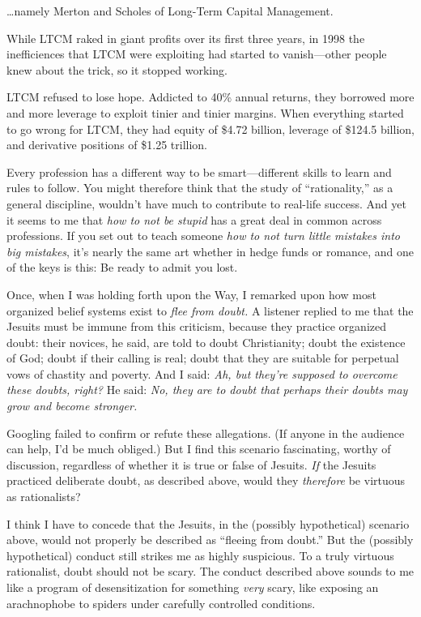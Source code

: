 {
 \ldots namely Merton and Scholes of Long-Term Capital Management.}

{
 While LTCM raked in giant profits over its first three years, in
1998 the inefficiences that LTCM were exploiting had started to
vanish---other people knew about the trick, so it stopped working.}

{
 LTCM refused to lose hope. Addicted to 40\% annual returns, they
borrowed more and more leverage to exploit tinier and tinier margins.
When everything started to go wrong for LTCM, they had equity of \$4.72
billion, leverage of \$124.5 billion, and derivative positions of
\$1.25 trillion.}

{
 Every profession has a different way to be smart---different
skills to learn and rules to follow. You might therefore think that the
study of ``rationality,'' as a
general discipline, wouldn't have much to contribute to
real-life success. And yet it seems to me that \textit{how to not be
stupid} has a great deal in common across professions. If you set out
to teach someone \textit{how to not turn little mistakes into big
mistakes}, it's nearly the same art whether in hedge
funds or romance, and one of the keys is this: Be ready to admit you
lost.}

\myendsectiontext


{
 Once, when I was holding forth upon the Way, I remarked upon how
most organized belief systems exist to \textit{flee from doubt.} A
listener replied to me that the Jesuits must be immune from this
criticism, because they practice organized doubt: their novices, he
said, are told to doubt Christianity; doubt the existence of God; doubt
if their calling is real; doubt that they are suitable for perpetual
vows of chastity and poverty. And I said: \textit{Ah, but
they're supposed to overcome these doubts, right?} He
said: \textit{No, they are to doubt that perhaps their doubts may grow
and become stronger.} }

{
 Googling failed to confirm or refute these allegations. (If anyone
in the audience can help, I'd be much obliged.) But I
find this scenario fascinating, worthy of discussion, regardless of
whether it is true or false of Jesuits. \textit{If} the Jesuits
practiced deliberate doubt, as described above, would they
\textit{therefore} be virtuous as rationalists?}

{
 I think I have to concede that the Jesuits, in the (possibly
hypothetical) scenario above, would not properly be described as
``fleeing from doubt.'' But the
(possibly hypothetical) conduct still strikes me as highly suspicious.
To a truly virtuous rationalist, doubt should not be scary. The conduct
described above sounds to me like a program of desensitization for
something \textit{very} scary, like exposing an arachnophobe to spiders
under carefully controlled conditions.}

